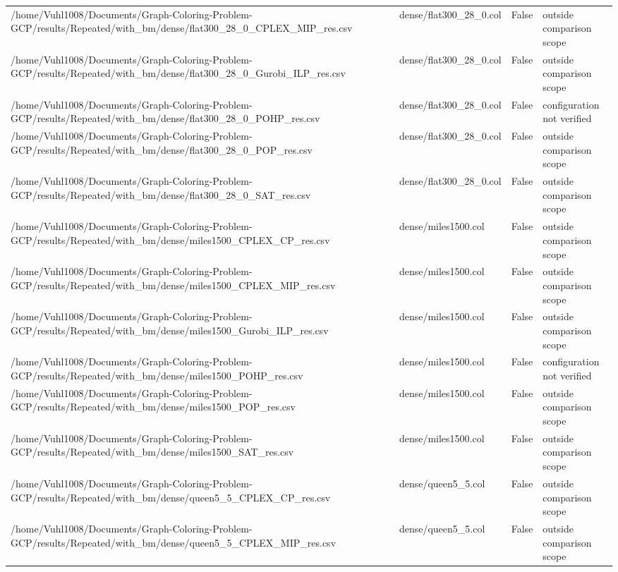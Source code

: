 \begin{table}[htbp]
\begin{tabular}{llll}
/home/Vuhl1008/Documents/Graph-Coloring-Problem-GCP/results/Repeated/with\_bm/dense/flat300\_28\_0\_CPLEX\_MIP\_res.csv & dense/flat300\_28\_0.col & False & outside comparison scope \\
/home/Vuhl1008/Documents/Graph-Coloring-Problem-GCP/results/Repeated/with\_bm/dense/flat300\_28\_0\_Gurobi\_ILP\_res.csv & dense/flat300\_28\_0.col & False & outside comparison scope \\
/home/Vuhl1008/Documents/Graph-Coloring-Problem-GCP/results/Repeated/with\_bm/dense/flat300\_28\_0\_POHP\_res.csv & dense/flat300\_28\_0.col & False & configuration not verified \\
/home/Vuhl1008/Documents/Graph-Coloring-Problem-GCP/results/Repeated/with\_bm/dense/flat300\_28\_0\_POP\_res.csv & dense/flat300\_28\_0.col & False & outside comparison scope \\
/home/Vuhl1008/Documents/Graph-Coloring-Problem-GCP/results/Repeated/with\_bm/dense/flat300\_28\_0\_SAT\_res.csv & dense/flat300\_28\_0.col & False & outside comparison scope \\
/home/Vuhl1008/Documents/Graph-Coloring-Problem-GCP/results/Repeated/with\_bm/dense/miles1500\_CPLEX\_CP\_res.csv & dense/miles1500.col & False & outside comparison scope \\
/home/Vuhl1008/Documents/Graph-Coloring-Problem-GCP/results/Repeated/with\_bm/dense/miles1500\_CPLEX\_MIP\_res.csv & dense/miles1500.col & False & outside comparison scope \\
/home/Vuhl1008/Documents/Graph-Coloring-Problem-GCP/results/Repeated/with\_bm/dense/miles1500\_Gurobi\_ILP\_res.csv & dense/miles1500.col & False & outside comparison scope \\
/home/Vuhl1008/Documents/Graph-Coloring-Problem-GCP/results/Repeated/with\_bm/dense/miles1500\_POHP\_res.csv & dense/miles1500.col & False & configuration not verified \\
/home/Vuhl1008/Documents/Graph-Coloring-Problem-GCP/results/Repeated/with\_bm/dense/miles1500\_POP\_res.csv & dense/miles1500.col & False & outside comparison scope \\
/home/Vuhl1008/Documents/Graph-Coloring-Problem-GCP/results/Repeated/with\_bm/dense/miles1500\_SAT\_res.csv & dense/miles1500.col & False & outside comparison scope \\
/home/Vuhl1008/Documents/Graph-Coloring-Problem-GCP/results/Repeated/with\_bm/dense/queen5\_5\_CPLEX\_CP\_res.csv & dense/queen5\_5.col & False & outside comparison scope \\
/home/Vuhl1008/Documents/Graph-Coloring-Problem-GCP/results/Repeated/with\_bm/dense/queen5\_5\_CPLEX\_MIP\_res.csv & dense/queen5\_5.col & False & outside comparison scope \\

\end{tabular}
\end{table}
